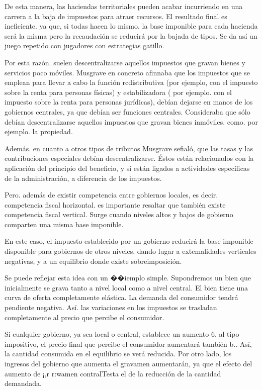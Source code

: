 \documentclass[10pt,a4paper]{article}
\begin{document}
De esta manera, las haciendas territoriales pueden acabar incurriendo en una carrera a la baja de impuestos para atraer recursos. El resultado final es ineficiente. ya que, si todas hacen lo mismo. la base imponible para cada hacienda será la misma pero la recaudación se reducirá por la bajada de tipos. Se da así un juego repetido con jugadores con estrategias gatillo.

Por esta razón. suelen descentralizarse aquellos impuestos que gravan bienes y servicios poco móviles. Musgrave en concreto afinnaba que los impuestos que se emplean para llevar a cabo la función rcdistributiva (por ejemplo, con el impuesto sobre la renta para personas físicas) y estabilizadora ( por ejemplo. con el impuesto sobre la renta para personas jurídicas), debían dejarse en manos de los gobiernos centrales, ya que debían ser funciones centrales. Consideraba que sólo debían descentralizarse aquellos impuestos que gravan bienes inmóviles. como. por ejemplo. la propiedad.

Además. en cuanto a otros tipos de tributos Musgrave sefialó, que las tasas y las contribuciones especiales debían descentralizarse. Éstos están relacionados con la aplicación del principio del  beneficio, y sí están ligados a actividades específicas de la administración, a diferencia de los impuestos.

Pero. además de existir competencia entre gobiernos locales, es decir. competencia fiscal horizontal. es importante resaltar que también existe competencia fiscal vertical. Surge cuando niveles altos y bajos de gobierno comparten una misma base imponible. 

En este caso, el impuesto establecido por un gobierno reducirá la base imponible disponible para gobiernos de otros niveles, dando lugar a extemalidades verticales negativas, y a un equilibrio donde existe sobreimposición.

Se puede reflejar esta idea con un ��iemplo simple. Supondremos un bien que inicialmente se grava tanto a nivel local como a nivel central. El bien tiene una curva de oferta completamente elástica. La demanda del consumidor tendrá pendiente negativa. Así. las variaciones en los impuestos se trasladan completamente al precio que percibe el consumidor.

Si cualquier gobierno, ya sea local o central, establece un aumento 6. al tipo impositivo, el precio final que percibe el consumidor aumentará también b.. Así, la cantidad consumida en el equilibrio se verá reducida. Por otro lado, los ingresos del gobierno que aumenta el gravamen aumentarán, ya que el efecto del aumento de ¡,r r:wamen contraITesta el de la reducción de la cantidad demandada.
\end{document}
